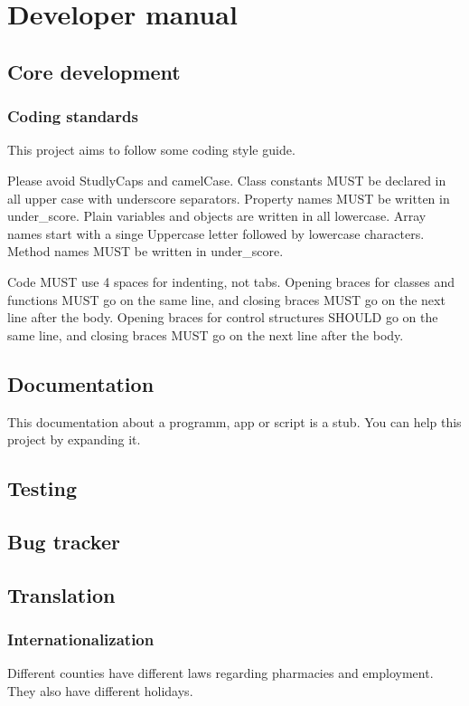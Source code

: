 
\chapter{Developer manual}
\section{Core development}
\subsection{Coding standards}
This project aims to follow some coding style guide.

Please avoid StudlyCaps and camelCase.
Class constants MUST be declared in all upper case with underscore separators.
Property names MUST be written in under{\_}score. Plain variables and objects are written in all lowercase. Array names start with a singe Uppercase letter followed by lowercase characters.
Method names MUST be written in under{\_}score.

Code MUST use 4 spaces for indenting, not tabs.
Opening braces for classes and functions MUST go on the same line, and closing braces MUST go on the next line after the body.
Opening braces for control structures SHOULD go on the same line, and closing
braces MUST go on the next line after the body.
\section{Documentation}
This documentation about a programm, app or script is a stub. You can help this project by expanding it.

\section{Testing}
\section{Bug tracker}
\section{Translation}
\subsection{Internationalization}
Different counties have different laws regarding pharmacies and employment. They also have different holidays.

